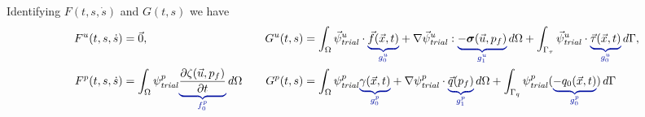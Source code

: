 Identifying $F(t,s,\dot{s})$ and $G(t,s)$ we have
\begin{alignat}{2}
  F^u(t,s,\dot{s}) &= \vec{0},
  & \quad
  G^u(t,s) &= \int_\Omega \trialvec[u] \cdot \eqnannotate{\vec{f}(\vec{x},t)}{g^u_0} + \nabla 
\trialvec[u] : 
\eqnannotate{-\tensor{\sigma}(\vec{u},p_f)}{g^u_1} \, d\Omega + \int_{\Gamma_\tau} 
\trialvec[u] \cdot 
\eqnannotate{\vec{\tau}(\vec{x},t)}{g^u_0} \, d\Gamma, \\
  F^p(t,s,\dot{s}) &= \int_\Omega  \trialscalar[p] \eqnannotate{\frac{\partial 
\zeta(\vec{u},p_f)}{\partial t}}
{f^p_0} \, d\Omega
  & \quad
  G^p(t,s) &= \int_\Omega \trialscalar[p] \eqnannotate{\gamma(\vec{x},t)}{g^p_0} + \nabla 
\trialscalar[p] \cdot 
\eqnannotate{\vec{q}(p_f)}{g^p_1} \, d\Omega
 + \int_{\Gamma_q} \trialscalar[p] (\eqnannotate{-q_0(\vec{x},t)}{g^p_0}) \, d\Gamma
\end{alignat}
